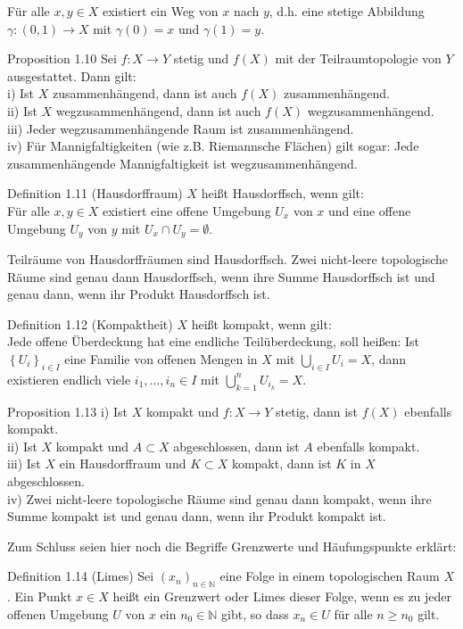 \documentclass[10pt, letterpaper]{article}
\begin{document}
Für alle $x, y \in X$ existiert ein Weg von $x$ nach $y$, d.h. eine stetige Abbildung $\gamma:(0,1) \rightarrow X$ mit $\gamma(0)=x$ und $\gamma(1)=y$.

Proposition 1.10 Sei $f: X \rightarrow Y$ stetig und $f(X)$ mit der Teilraumtopologie von $Y$ ausgestattet. Dann gilt:\\
i) Ist $X$ zusammenhängend, dann ist auch $f(X)$ zusammenhängend.\\
ii) Ist $X$ wegzusammenhängend, dann ist auch $f(X)$ wegzusammenhängend.\\
iii) Jeder wegzusammenhängende Raum ist zusammenhängend.\\
iv) Für Mannigfaltigkeiten (wie z.B. Riemannsche Flächen) gilt sogar: Jede zusammenhängende Mannigfaltigkeit ist wegzusammenhängend.

Definition 1.11 (Hausdorffraum) $X$ heißt Hausdorffsch, wenn gilt:\\
Für alle $x, y \in X$ existiert eine offene Umgebung $U_{x}$ von $x$ und eine offene Umgebung $U_{y}$ von $y$ mit $U_{x} \cap U_{y}=\emptyset$.

Teilräume von Hausdorffräumen sind Hausdorffsch. Zwei nicht-leere topologische Räume sind genau dann Hausdorffsch, wenn ihre Summe Hausdorffsch ist und genau dann, wenn ihr Produkt Hausdorffsch ist.

Definition 1.12 (Kompaktheit) $X$ heißt kompakt, wenn gilt:\\
Jede offene Überdeckung hat eine endliche Teilüberdeckung, soll heißen: Ist $\left\{U_{i}\right\}_{i \in I}$ eine Familie von offenen Mengen in $X$ mit $\bigcup_{i \in I} U_{i}=X$, dann existieren endlich viele $i_{1}, \ldots, i_{n} \in I$ mit $\bigcup_{k=1}^{n} U_{i_{k}}=X$.

Proposition 1.13 i) Ist $X$ kompakt und $f: X \rightarrow Y$ stetig, dann ist $f(X)$ ebenfalls kompakt.\\
ii) Ist $X$ kompakt und $A \subset X$ abgeschlossen, dann ist $A$ ebenfalls kompakt.\\
iii) Ist $X$ ein Hausdorffraum und $K \subset X$ kompakt, dann ist $K$ in $X$ abgeschlossen.\\
iv) Zwei nicht-leere topologische Räume sind genau dann kompakt, wenn ihre Summe kompakt ist und genau dann, wenn ihr Produkt kompakt ist.

Zum Schluss seien hier noch die Begriffe Grenzwerte und Häufungspunkte erklärt:

Definition 1.14 (Limes) Sei $\left(x_{n}\right)_{n \in \mathbb{N}}$ eine Folge in einem topologischen Raum $X$. Ein Punkt $x \in X$ heißt ein Grenzwert oder Limes dieser Folge, wenn es zu jeder offenen Umgebung $U$ von $x$ ein $n_{0} \in \mathbb{N}$ gibt, so dass $x_{n} \in U$ für alle $n \geq n_{0}$ gilt.
\end{document}
